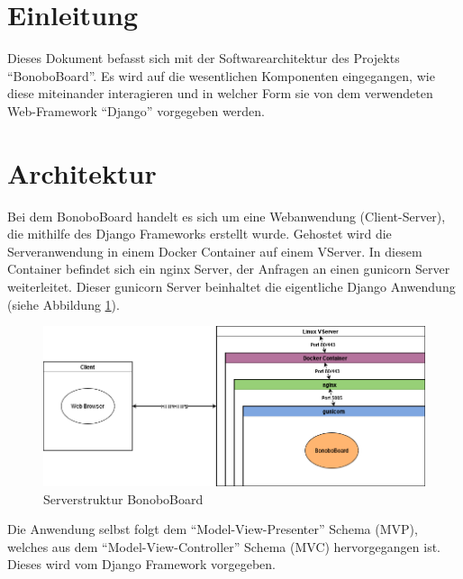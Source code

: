 \documentclass[a4paper,11pt]{scrartcl}
\begin{document}



\section{Einleitung}
Dieses Dokument befasst sich mit der Softwarearchitektur des Projekts "`BonoboBoard"'. Es wird auf die wesentlichen Komponenten eingegangen, wie diese miteinander interagieren und in welcher Form sie von dem verwendeten Web-Framework "`Django"' vorgegeben werden.

\section{Architektur}

Bei dem BonoboBoard handelt es sich um eine Webanwendung (Client-Server), die mithilfe des Django Frameworks erstellt wurde. Gehostet wird die Serveranwendung in einem Docker Container auf einem  VServer. In diesem Container befindet sich ein nginx Server, der Anfragen an einen gunicorn Server weiterleitet. Dieser gunicorn Server beinhaltet die eigentliche Django Anwendung (siehe Abbildung \ref{img:Serverstruktur}).

\begin{figure}[H]
	\includegraphics[width=\textwidth]{Serverstruktur}
	\caption{Serverstruktur BonoboBoard}
	\label{img:Serverstruktur}
\end{figure}

\noindent Die Anwendung selbst folgt dem "`Model-View-Presenter"' Schema (MVP), welches aus dem "`Model-View-Controller"' Schema (MVC) hervorgegangen ist. 
Dieses wird vom Django Framework vorgegeben. 
\end{document}
